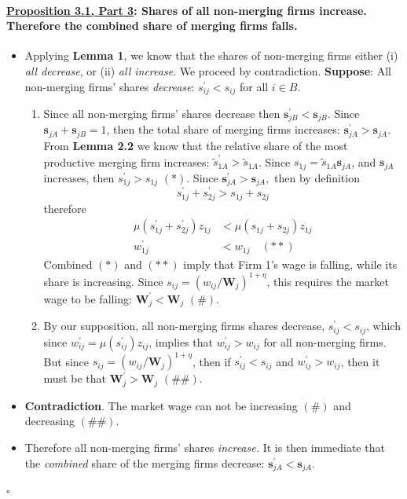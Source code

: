 \documentclass[12pt]{article}
\theoremstyle{prop}
\begin{document}
\paragraph{\underline{Proposition 3.1, Part 3}: Shares of all non-merging firms increase. Therefore the combined
	share of merging firms falls. } 
\begin{itemize}
	\item Applying \textbf{Lemma 1}, we know that the shares of non-merging
	firms either (i) \emph{all decrease}, or (ii) \emph{all increase}.
	We proceed by contradiction. \textbf{Suppose}: All non-merging firms'
	shares \emph{decrease}: $s_{ij}^{\prime}<s_{ij}$ for all $i\in B$.
	\begin{enumerate}
		\item Since all non-merging firms' shares decrease then $\boldsymbol{s}_{jB}^{\prime}<\boldsymbol{s}_{jB}$.
		Since $\boldsymbol{s}_{jA}+\boldsymbol{s}_{jB}=1$, then the total
		share of merging firms increases: $\boldsymbol{s}_{jA}^{\prime}>\boldsymbol{s}_{jA}$.
		From \textbf{Lemma 2.2} we know that the relative share of the most
		productive merging firm increases: $\widetilde{s}_{1A}^{\prime}>\widetilde{s}_{1A}$.
		Since $s_{1j}=\widetilde{s}_{1A}\boldsymbol{s}_{jA}$, and $\boldsymbol{s}_{jA}$
		increases, then $s_{1j}^{\prime}>s_{1j}$ $\left(\ast\right)$. Since
		$\boldsymbol{s}_{jA}^{\prime}>\boldsymbol{s}_{jA},$ then by definition
		\[
		s_{1j}^{\prime}+s_{2j}^{\prime}>s_{1j}+s_{2j}
		\]
		therefore
		\begin{align*}
			\mu\left(s_{1j}^{\prime}+s_{2j}^{\prime}\right)z_{1j} & <\mu\left(s_{1j}+s_{2j}\right)z_{1j}\\
			w_{1j}^{\prime} & <w_{1j}\quad\left(\ast\ast\right)
		\end{align*}
		Combined $\left(\ast\right)$ and $\left(\ast\ast\right)$ imply that
		Firm 1's wage is falling, while its share is increasing. Since $s_{ij}=\left(w_{ij}/\mathbf{W}_{j}\right)^{1+\eta}$,
		this requires the market wage to be falling: $\mathbf{W}_{j}^{\prime}<\mathbf{W}_{j}$
		$\left(\#\right)$.
		\item By our supposition, all non-merging firms shares decrease, $s_{ij}^{\prime}<s_{ij}$,
		which since $w_{ij}^{\prime}=\mu\left(s_{ij}^{\prime}\right)z_{ij}$,
		implies that $w_{ij}^{\prime}>w_{ij}$ for all non-merging firms.
		But since $s_{ij}=\left(w_{ij}/\mathbf{W}_{j}\right)^{1+\eta}$,
		then if $s_{ij}^{\prime}<s_{ij}$ and $w_{ij}^{\prime}>w_{ij}$, then
		it must be that $\mathbf{W}_{j}^{\prime}>\mathbf{W}_{j}$
		$\left(\#\#\right)$.
	\end{enumerate}
	\item \textbf{Contradiction}. The market wage can not be increasing $\left(\#\right)$
	and decreasing $\left(\#\#\right)$.
	\item Therefore all non-merging firms' shares \emph{increase. }It is then
	immediate that the \emph{combined }share of the merging firms decrease:
	$\boldsymbol{s}_{jA}^{\prime}<\boldsymbol{s}_{jA}$.
\end{itemize}
 \begin{flushright}
      $\square$
 \end{flushright}
\end{document}
